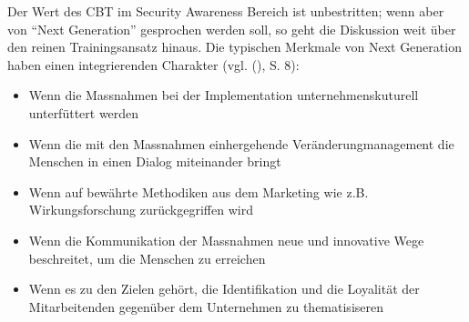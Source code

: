 \documentclass[../../main.tex]{subfiles}
\begin{document}
\begin{sloppypar}
Der Wert des CBT im Security Awareness Bereich ist unbestritten; wenn aber von "`Next Generation"' gesprochen werden soll, so geht die Diskussion weit über den reinen Trainingsansatz hinaus. Die typischen Merkmale von Next Generation haben einen integrierenden Charakter (vgl. \citeauthor{helisch_security_2009} (\citeyear{helisch_security_2009}), S. 8):

\begin{itemize}
\item Wenn die Massnahmen bei der Implementation unternehmenskuturell unterfüttert werden

\item Wenn die mit den Massnahmen einhergehende Veränderungmanagement die Menschen in einen Dialog miteinander bringt

\item Wenn auf bewährte Methodiken aus dem Marketing wie z.B. Wirkungsforschung zurückgegriffen wird

\item Wenn die Kommunikation der Massnahmen neue und innovative Wege beschreitet, um die Menschen zu erreichen

\item Wenn es zu den Zielen gehört, die Identifikation und die Loyalität der Mitarbeitenden gegenüber dem Unternehmen zu thematisiseren
\end{itemize}

\end{sloppypar}
\end{document}
